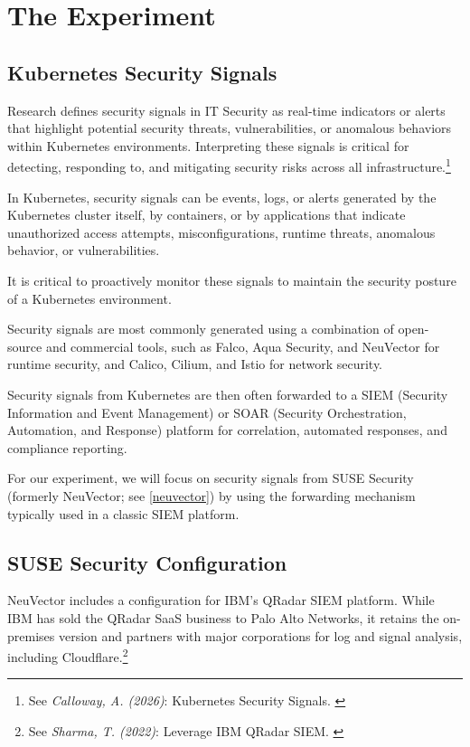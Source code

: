 %
%

\pagebreak
\section{The Experiment}

\onehalfspacing

\subsection{Kubernetes Security Signals}

Research defines security signals in IT Security as real-time indicators or alerts that highlight potential security threats, vulnerabilities, or anomalous behaviors within Kubernetes environments. Interpreting these signals is critical for detecting, responding to, and mitigating security risks across all infrastructure.\footnote {See \textit{Calloway, A. (2026)}: Kubernetes Security Signals. \cite{secSignals}}

In Kubernetes, security signals can be events, logs, or alerts generated by the Kubernetes cluster itself, by containers, or by applications that indicate unauthorized access attempts, misconfigurations, runtime threats, anomalous behavior, or vulnerabilities.

It is critical to proactively monitor these signals to maintain the security posture of a Kubernetes environment.

Security signals are most commonly generated using a combination of open-source and commercial tools, such as Falco, Aqua Security, and NeuVector for runtime security, and Calico, Cilium, and Istio for network security. 

Security signals from Kubernetes are then often forwarded to a SIEM (Security Information and Event Management) or SOAR (Security Orchestration, Automation, and Response) platform for correlation, automated responses, and compliance reporting.

For our experiment, we will focus on security signals from SUSE Security (formerly NeuVector; see \ref{neuvector}) by using the forwarding mechanism typically used in a classic SIEM platform.

\subsection{SUSE Security Configuration}

NeuVector includes a configuration for IBM's QRadar SIEM platform. While IBM has sold the QRadar SaaS business to Palo Alto Networks, it retains the on-premises version and partners with major corporations for log and signal analysis, including Cloudflare.\footnote{See \textit{Sharma, T. (2022)}: Leverage IBM QRadar SIEM. \cite{cloudRadar}}

